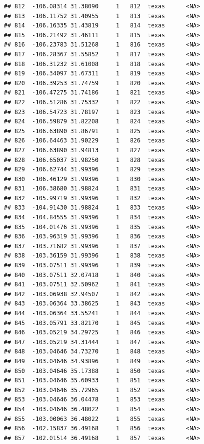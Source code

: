 \documentclass[
]{article}
\begin{document}
\begin{verbatim}
## 812  -106.08314 31.38090     1   812  texas      <NA>
## 813  -106.11752 31.40955     1   813  texas      <NA>
## 814  -106.16335 31.43819     1   814  texas      <NA>
## 815  -106.21492 31.46111     1   815  texas      <NA>
## 816  -106.23783 31.51268     1   816  texas      <NA>
## 817  -106.28367 31.55852     1   817  texas      <NA>
## 818  -106.31232 31.61008     1   818  texas      <NA>
## 819  -106.34097 31.67311     1   819  texas      <NA>
## 820  -106.39253 31.74759     1   820  texas      <NA>
## 821  -106.47275 31.74186     1   821  texas      <NA>
## 822  -106.51286 31.75332     1   822  texas      <NA>
## 823  -106.54723 31.78197     1   823  texas      <NA>
## 824  -106.59879 31.82208     1   824  texas      <NA>
## 825  -106.63890 31.86791     1   825  texas      <NA>
## 826  -106.64463 31.90229     1   826  texas      <NA>
## 827  -106.63890 31.94813     1   827  texas      <NA>
## 828  -106.65037 31.98250     1   828  texas      <NA>
## 829  -106.62744 31.99396     1   829  texas      <NA>
## 830  -106.46129 31.99396     1   830  texas      <NA>
## 831  -106.38680 31.98824     1   831  texas      <NA>
## 832  -105.99719 31.99396     1   832  texas      <NA>
## 833  -104.91430 31.98824     1   833  texas      <NA>
## 834  -104.84555 31.99396     1   834  texas      <NA>
## 835  -104.01476 31.99396     1   835  texas      <NA>
## 836  -103.96319 31.99396     1   836  texas      <NA>
## 837  -103.71682 31.99396     1   837  texas      <NA>
## 838  -103.36159 31.99396     1   838  texas      <NA>
## 839  -103.07511 31.99396     1   839  texas      <NA>
## 840  -103.07511 32.07418     1   840  texas      <NA>
## 841  -103.07511 32.50962     1   841  texas      <NA>
## 842  -103.06938 32.94507     1   842  texas      <NA>
## 843  -103.06364 33.38625     1   843  texas      <NA>
## 844  -103.06364 33.55241     1   844  texas      <NA>
## 845  -103.05791 33.82170     1   845  texas      <NA>
## 846  -103.05219 34.29725     1   846  texas      <NA>
## 847  -103.05219 34.31444     1   847  texas      <NA>
## 848  -103.04646 34.73270     1   848  texas      <NA>
## 849  -103.04646 34.93896     1   849  texas      <NA>
## 850  -103.04646 35.17388     1   850  texas      <NA>
## 851  -103.04646 35.60933     1   851  texas      <NA>
## 852  -103.04646 35.72965     1   852  texas      <NA>
## 853  -103.04646 36.04478     1   853  texas      <NA>
## 854  -103.04646 36.48022     1   854  texas      <NA>
## 855  -103.00063 36.48022     1   855  texas      <NA>
## 856  -102.15837 36.49168     1   856  texas      <NA>
## 857  -102.01514 36.49168     1   857  texas      <NA>

\end{verbatim}
\end{document}
